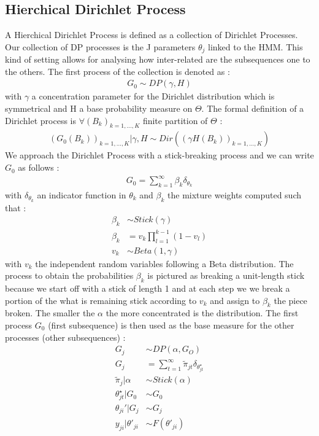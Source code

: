 \subsection{Hierchical Dirichlet Process}
A Hierchical Dirichlet Process is defined as a collection of Dirichlet Processes. Our collection of DP processes is the J parameters $\theta_j$ linked to the HMM. This kind of setting allows for analysing how inter-related are the subsequences one to the others. The first process of the collection is denoted as : 
\begin{align*}
	G_0\sim DP(\gamma, H)
\end{align*}
with $\gamma$ a concentration parameter for the Dirichlet distribution which is symmetrical and H a base probability measure on $\Theta$. The formal definition of a Dirichlet process is $\forall (B_k)_{k=1,\dots, K}$ finite partition of $\Theta$ : \begin{align*}
	(G_0(B_k))_{k=1,\dots, K}|\gamma, H \sim Dir( (\gamma H(B_k))_{k=1,\dots, K})
\end{align*}
We approach the Dirichlet Process with a stick-breaking process and we can write $G_0$ as follows :
\begin{align*}
	G_0=\sum^\infty_{k=1} \beta_k \delta_{\theta_k}
\end{align*}
with $\delta_{\theta_k}$ an indicator function in $\theta_k$ and $\beta_k$ the mixture weights computed such that :
\begin{align*}
\beta_k &\sim Stick(\gamma) \\
	\beta_k&= v_k\prod^{k-1}_{l=1}(1- v_l) \\
	v_k&\sim Beta(1, \gamma)
\end{align*}
with $v_k$ the independent random variables following a Beta distribution. The process to obtain the probabilities $\beta_k$ is pictured as breaking a unit-length stick because we start off with a stick of length 1 and at each step we  we break a portion of the what is remaining stick according to $v_k$ and assign to $\beta_k$ the piece broken. The smaller the $\alpha$ the more concentrated is the distribution. The first process $G_0$ (first subsequence) is then used as the base measure for the other processes (other subsequences) : 
\begin{align*}
	G_j &\sim DP(\alpha, G_O) \\
	G_j &= \sum^\infty_{t=1}\tilde{\pi}_{jt} \delta_{\theta^\star_{jt}} \\
	\tilde{\pi}_{j}| \alpha &\sim Stick(\alpha) \\
	\theta^\star_{jt}|G_0 &\sim G_0 \\
	\theta_{ji}'|G_j &\sim G_j \\
	y_{ji} |\theta'_{ji} &\sim F(\theta'_{ji})\end{align*} 
